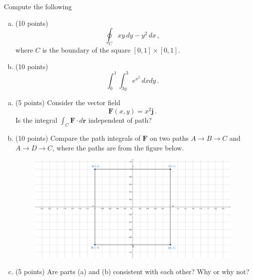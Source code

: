 \documentclass[12pt]{article}
\newcommand{\vect}{\mathbf}
\begin{document}
\newpage
\begin{problem}
    Compute the following
    \begin{enumerate}[(a)] 
        \item (10 points) $$\oint_C xy \, dy - y^2 \, dx \,,$$
            where $C$ is the boundary of the square $[0,1]\times [0,1]$.
        \item  (10 points)
            $$\int_0^1 \int_{3y}^3 e^{x^2} \, dx dy \,.$$
    \end{enumerate}

\end{problem}

\newpage
\begin{problem}
    \begin{enumerate}[(a)]
        \item (5 points) Consider the vector field
            \begin{equation*}
                \vect{F}(x,y) = x^2 \vect{j} \,.
            \end{equation*}
            Is the integral $\int_C \vect{F} \cdot d\vect{r}$ independent of path?

        \item (10 points)
            Compare
            the path integrals of $\vect{F}$ on two paths $A\to B \to C$ and $A\to D \to C$,
            where the paths are from the figure below.
            \begin{figure}[!h]
            \includegraphics[width=1.5\textwidth]{paths.pdf}
            \end{figure}
    \item (5 points) Are parts (a) and (b) consistent with each other? Why or why not?
    \end{enumerate}

\end{problem}
\end{document}
